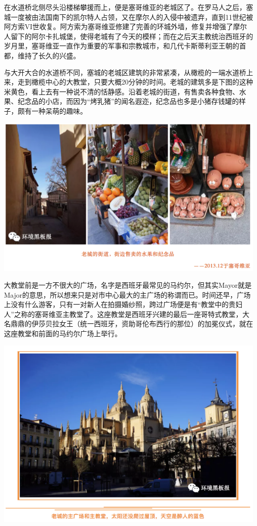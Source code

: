 \documentclass[]{book}
\begin{document}
在水道桥北侧尽头沿楼梯攀援而上，便是塞哥维亚的老城区了。在罗马人之后，塞城一度被由法国南下的凯尔特人占领，又在摩尔人的入侵中被遗弃，直到11世纪被阿方索VI世收复。阿方索为塞哥维亚修建了完善的环城外墙，修复并增强了摩尔人留下的阿尔卡扎城堡，使得老城有了今天的模样；而在之后天主教统治西班牙的岁月里，塞哥维亚一直作为重要的军事和宗教城市，和几代卡斯蒂利亚王朝的首都，维持了长久的兴盛。

与大开大合的水道桥不同，塞城的老城区建筑的非常紧凑，从橄榄的一端水道桥上来，走到橄榄中心的大教堂，只要大概20分钟的时间。老城的建筑多是下图的这种米黄色，看上去有一种说不清的恬静感。沿着老城的街道，有售卖各种食物、水果、纪念品的小店，而因为``烤乳猪''的闻名遐迩，纪念品也多是小猪存钱罐的样子，颇有一种呆萌的趣味。

\includegraphics[width=8.33in]{images/xt49}

大教堂前是一方不很大的广场，名字是西班牙最常见的马约尔，但其实Mayor就是Major的意思，所以想来只是对市中心最大的主广场的称谓而已。时间还早，广场上没有什么游客，只有一对新人在拍摄婚纱照，跨过广场便是有``教堂中的贵妇人''之称的塞哥维亚主教堂了。这座教堂是西班牙兴建的最后一座哥特式教堂，大名鼎鼎的伊莎贝拉女王（统一西班牙，资助哥伦布西行的那位）的加冕仪式，就在这座教堂和前面的马约尔广场上举行。

\includegraphics[width=8.33in]{images/xt50}
\end{document}

